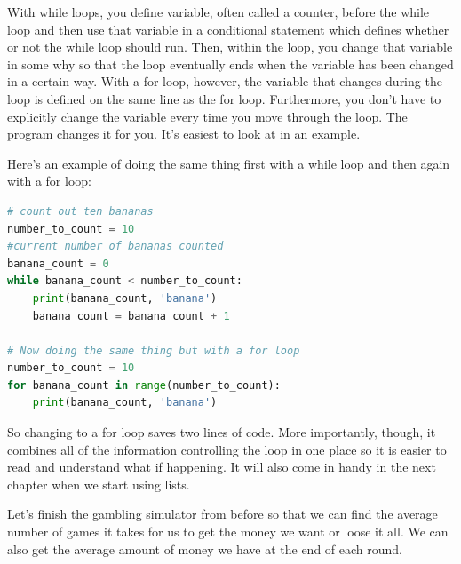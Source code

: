 \documentclass[]{article}
\begin{document}
With while loops, you define variable, often called a counter,  before the while loop and then use that variable in a conditional statement which defines whether or not the while loop should run.  Then, within the loop, you change that variable in some why so that the loop eventually ends when the variable has been changed in a certain way.  With a for loop, however, the variable that changes during the loop is defined on the same line as the for loop. Furthermore, you don't have to explicitly change the variable every time you move through the loop. The program changes it for you. It's easiest to look at in an example.

Here's an example of doing the same thing first with a while loop and then again with a for loop:

\begin{lstlisting}[language=python]
# count out ten bananas
number_to_count = 10
#current number of bananas counted
banana_count = 0
while banana_count < number_to_count:
    print(banana_count, 'banana')
    banana_count = banana_count + 1

# Now doing the same thing but with a for loop
number_to_count = 10
for banana_count in range(number_to_count):
    print(banana_count, 'banana')
\end{lstlisting}

So changing to a for loop saves two lines of code.  More importantly, though, it combines all of the information controlling the loop in one place so it is easier to read and understand what if happening.  It will also come in handy in the next chapter when we start using lists.



Let's finish the gambling simulator from before so that we can find the average number of games it takes for us to get the money we want or loose it all. We can also get the average amount of money we have at the end of each round.
\end{document}
